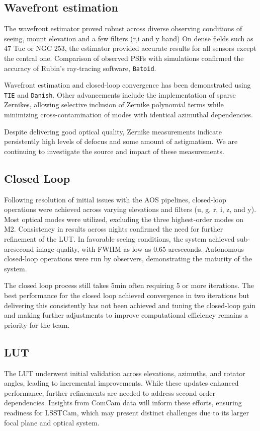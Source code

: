 \subsection{Wavefront estimation}
The wavefront estimator proved robust across diverse observing conditions of seeing, mount elevation and a few filters (r,i and y band) 
On dense fields such as 47 Tuc or NGC 253, the estimator provided accurate results for  all sensors except the central one.  Comparison of observed PSFs with simulations  confirmed the  accuracy of Rubin's ray-tracing software, \texttt{Batoid}.

Wavefront estimation and closed-loop convergence has been demonstrated using \texttt{TIE} and \texttt{Danish}. Other advancements include the implementation of sparse Zernikes,  allowing selective inclusion of Zernike polynomial terms while minimizing cross-contamination 
of modes with identical azimuthal dependencies.

Despite delivering good optical quality, Zernike measurements indicate persistently high levels of defocus and some amount of astigmatism. We are continuing to investigate the source and impact of these measurements.

\subsection{Closed Loop}
Following resolution of initial issues with the AOS pipelines,  closed-loop operations were achieved across varying elevations and filters (u, g, r, i, z, and y).  Most optical modes were utilized, excluding the three highest-order modes on M2.  Consistency in results across nights confirmed the need for further refinement of the LUT. In favorable seeing conditions, the system achieved sub-arcsecond image quality, with FWHM as low as 0.65 arcseconds. Autonomous closed-loop operations were run by observers, demonstrating the maturity of the system. 


The closed loop process still takes 5min  often requiring 5 or more iterations. The best performance for the closed loop achieved convergence in two iterations but delivering this consistently has not been achieved and tuning the closed-loop gain and making further adjustments to improve computational  efficiency remains a priority for the team.

\subsection{LUT}
The LUT underwent initial validation across elevations, azimuths, and rotator angles, 
leading to incremental improvements. While these updates enhanced performance, 
further refinements are needed to address second-order dependencies. Insights 
from ComCam data will inform these efforts, ensuring readiness for LSSTCam, which 
may present distinct challenges due to its larger focal plane and optical system.



